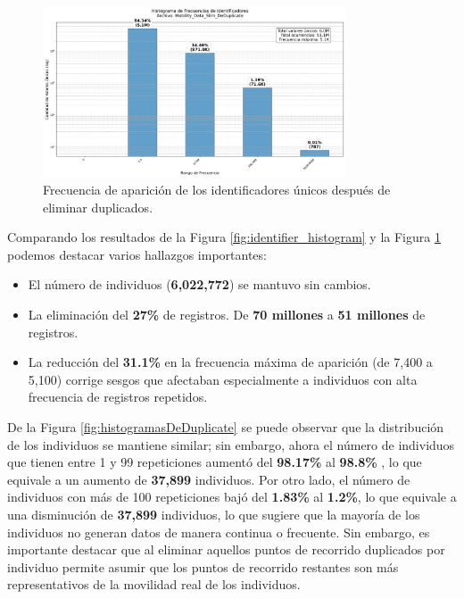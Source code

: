 \begin{figure}[H]
    \centering
    \includegraphics[width=0.8\textwidth]{img/histograma_identifier_Mobility_Data_Slim_DeDuplicate.png}
    \caption{Frecuencia de aparición de los identificadores únicos después de eliminar duplicados.}
    \label{fig:identifier_histogram_deduplicate}
\end{figure}

Comparando los resultados de la Figura \ref{fig:identifier_histogram} y la Figura \ref{fig:identifier_histogram_deduplicate} podemos destacar varios hallazgos importantes: 

\begin{itemize}
    \item El número de individuos (\textbf{6,022,772}) se mantuvo sin cambios.
    \item La eliminación del \textbf{27\%} de registros. De \textbf{70 millones} a \textbf{51 millones} de registros.
    \item La reducción del \textbf{31.1\%} en la frecuencia máxima de aparición (de 7,400 a 5,100) corrige sesgos que afectaban especialmente a individuos con alta frecuencia de registros repetidos. 
\end{itemize}

De la Figura \ref{fig:histogramasDeDuplicate} se puede observar que la distribución de los individuos se mantiene similar; sin embargo, ahora el número de individuos que tienen entre 1 y 99 repeticiones aumentó del \textbf{98.17\%} al \textbf{98.8\%} , lo que equivale a un aumento de \textbf{37,899} individuos. Por otro lado, el número de individuos con más de 100 repeticiones bajó del \textbf{1.83\%} al \textbf{1.2\%}, lo que equivale a una disminución de \textbf{37,899} individuos, lo que sugiere que la mayoría de los individuos no generan datos de manera continua o frecuente. Sin embargo, es importante destacar que al eliminar aquellos puntos de recorrido duplicados por individuo permite asumir que los puntos de recorrido restantes son más representativos de la movilidad real de los individuos.

